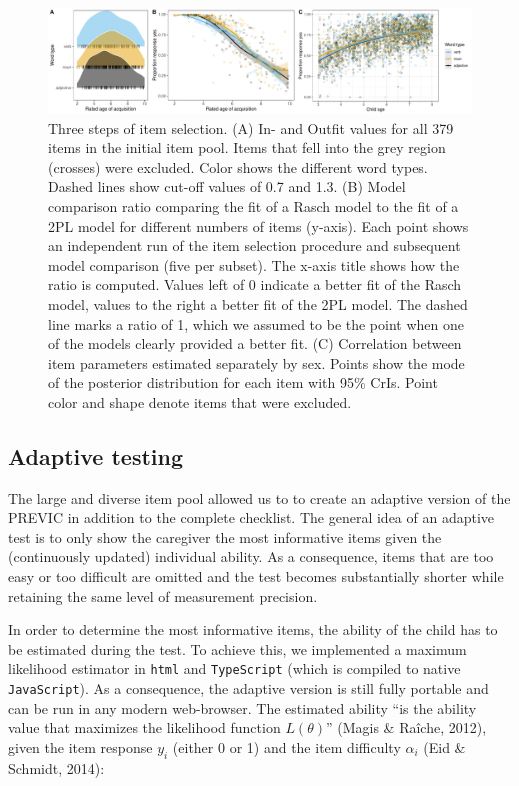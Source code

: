 \documentclass[
  man,floatsintext]{apa6}
\begin{document}
\begin{figure}

{\centering \includegraphics[width=1\linewidth]{../graphs/fig3} 

}

\caption{Three steps of item selection. (A) In- and Outfit values for all 379 items in the initial item pool. Items that fell into the grey region (crosses) were excluded. Color shows the different word types. Dashed lines show cut-off values of 0.7 and 1.3. (B) Model comparison ratio comparing the fit of a Rasch model to the fit of a 2PL model for different numbers of items (y-axis). Each point shows an independent run of the item selection procedure and subsequent model comparison (five per subset). The x-axis title shows how the ratio is computed. Values left of 0 indicate a better fit of the Rasch model, values to the right a better fit of the 2PL model. The dashed line marks a ratio of 1, which we assumed to be the point when one of the models clearly provided a better fit. (C) Correlation between item parameters estimated separately by sex. Points show the mode of the posterior distribution for each item with 95\% CrIs. Point color and shape denote items that were excluded.}\label{fig:fig3}
\end{figure}

\hypertarget{adaptive-testing}{%
\subsection{Adaptive testing}\label{adaptive-testing}}

The large and diverse item pool allowed us to to create an adaptive version of the PREVIC in addition to the complete checklist. The general idea of an adaptive test is to only show the caregiver the most informative items given the (continuously updated) individual ability. As a consequence, items that are too easy or too difficult are omitted and the test becomes substantially shorter while retaining the same level of measurement precision.

In order to determine the most informative items, the ability of the child has to be estimated during the test. To achieve this, we implemented a maximum likelihood estimator in \texttt{html} and \texttt{TypeScript} (which is compiled to native \texttt{JavaScript}). As a consequence, the adaptive version is still fully portable and can be run in any modern web-browser. The estimated ability ``is the ability value that maximizes the likelihood function \(L(\theta)\)'' (Magis \& Raîche, 2012), given the item response \(y_i\) (either 0 or 1) and the item difficulty \(\alpha_i\) (Eid \& Schmidt, 2014):
\end{document}
